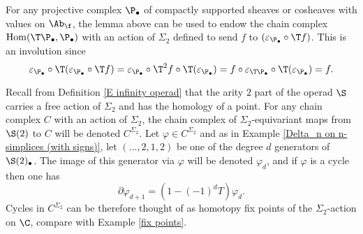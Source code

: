 \documentclass[thesis.tex]{subfiles}
\begin{document}
\begin{remark}\label{S_2 action on Hom(T,)}
For any projective complex $\P_\bullet$ of compactly supported sheaves or cosheaves with values on $\Ab_{\f}$, the lemma above can be used to endow the chain complex $\Hom(\T\P_\bullet,\P_\bullet)$ with an action of $\Sigma_2$ defined to send $f$ to $(\varepsilon_{\P_\bullet}\circ\T f)$. This is an involution since
$$\varepsilon_{\P_\bullet}\circ\T(\varepsilon_{\P_\bullet}\circ\T f)=\varepsilon_{\P_\bullet}\circ\T^2 f\circ\T(\varepsilon_{\P_\bullet})=
f\circ\varepsilon_{\T\P_\bullet}\circ\T(\varepsilon_{\P_\bullet})=f.$$
\end{remark}

\begin{notation}\label{homotopy fix points}
Recall from Definition \ref{E infinity operad} that the arity $2$ part of the operad $\S$ carries a free action of $\Sigma_2$ and has the homology of a point. For any chain complex $C$ with an action of $\Sigma_2$, the chain complex of $\Sigma_2$-equivariant maps from $\S(2)$ to $C$ will be denoted $C^{\Sigma_2}$. Let $\varphi\in C^{\Sigma_2}$ and as in Example \ref{Delta_n on n-simplices (with signs)}, let $(\dotsc,2,1,2)$ be one of the degree $d$ generators of $\S(2)_\bullet$. The image of this generator via $\varphi$ will be denoted $\varphi_d$, and if $\varphi$ is a cycle then one has
$$\partial \varphi_{d+1}=(1-(-1)^{d}T)\varphi_{d}.$$
Cycles in $C^{\Sigma_2}$ can be therefore thought of as homotopy fix points of the $\Sigma_2$-action on $\C$, compare with Example \ref{fix points}.
\end{notation}
\end{document}
